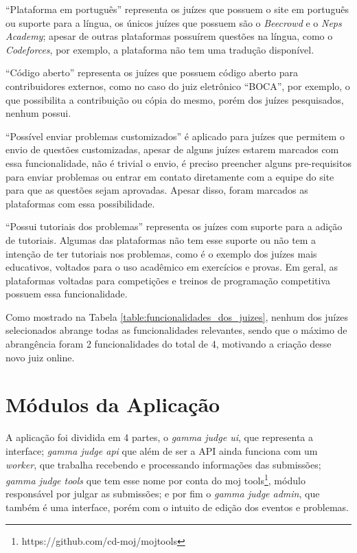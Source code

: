 “Plataforma em português” representa os juízes que possuem o site em português ou suporte para a língua, os únicos juízes que possuem são o \textit{Beecrowd} e o \textit{Neps Academy}; apesar de outras plataformas possuírem questões na língua, como o \textit{Codeforces}, por exemplo, a plataforma não tem uma tradução disponível.  

“Código aberto” representa os juízes que possuem código aberto para contribuidores externos, como no caso do juiz eletrônico “BOCA”, por exemplo, o que possibilita a contribuição ou cópia do mesmo, porém dos juízes pesquisados, nenhum possui. 

“Possível enviar problemas customizados” é aplicado para juízes que permitem o envio de questões customizadas, apesar de alguns juízes estarem marcados com essa funcionalidade, não é trivial o envio, é preciso preencher alguns pre-requisitos para enviar problemas ou entrar em contato diretamente com a equipe do site para que as questões sejam aprovadas. Apesar disso, foram marcados as plataformas com essa possibilidade. 

“Possui tutoriais dos problemas” representa os juízes com suporte para a adição de tutoriais. Algumas das plataformas não tem esse suporte ou não tem a intenção de ter tutoriais nos problemas, como é o exemplo dos juízes mais educativos, voltados para o uso acadêmico em exercícios e provas. Em geral, as plataformas voltadas para competições e treinos de programação competitiva possuem essa funcionalidade.
 
 Como mostrado na Tabela \ref{table:funcionalidades_dos_juizes}, nenhum dos juízes selecionados abrange todas as funcionalidades relevantes, sendo que o máximo de abrangência foram 2 funcionalidades do total de 4, motivando a criação desse novo juiz online.
 
\section{Módulos da Aplicação}
\label{sec:modulosDaAplicacao}

A aplicação foi dividida em 4 partes, o \textit{gamma judge ui}, que representa a interface; \textit{gamma judge api} que além de ser a API ainda funciona com um \textit{worker}, que trabalha recebendo e processando informações das submissões;  \textit{gamma judge tools} que tem esse nome por conta do moj tools\footnote{https://github.com/cd-moj/mojtools}, módulo responsável por julgar as submissões; e por fim o \textit{gamma judge admin}, que também é uma interface, porém com o intuito de edição dos eventos e problemas.

